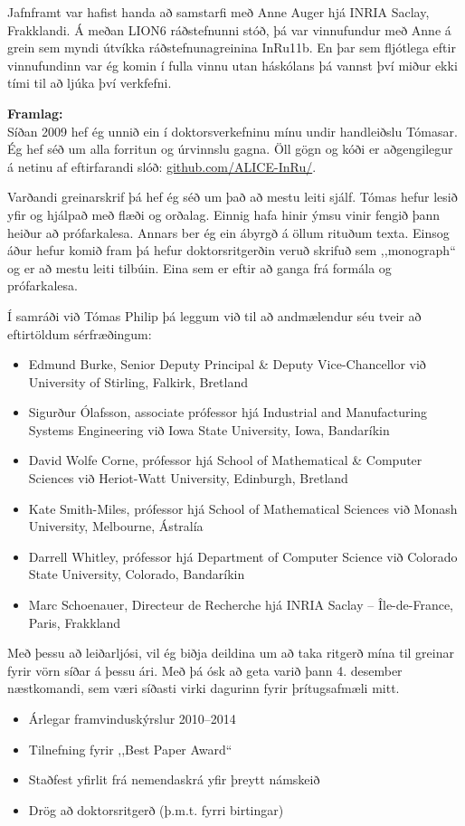 \documentclass{cover}
\newcommand{\mycaption}[1]{{\bfseries #1:}\\}
\begin{document}
{Jafnframt var hafist handa að samstarfi með Anne Auger hjá INRIA Saclay, 
Frakklandi. 
Á meðan LION6 ráðstefnunni stóð, þá var vinnufundur með Anne á grein sem myndi 
útvíkka ráðstefnunagreinina InRu11b. 
En þar sem fljótlega eftir vinnufundinn var ég komin í fulla vinnu utan 
háskólans þá vannst því miður ekki tími til að ljúka því verkfefni.

\mycaption{Framlag}
Síðan 2009 hef ég unnið ein í doktorsverkefninu mínu undir handleiðslu Tómasar. 
Ég hef séð um alla forritun og úrvinnslu gagna. Öll gögn og kóði er 
aðgengilegur á netinu af eftirfarandi slóð: \url{github.com/ALICE-InRu/}.

Varðandi greinarskrif þá hef ég séð um það að mestu leiti sjálf. Tómas hefur 
lesið yfir og hjálpað með flæði og orðalag. Einnig hafa hinir ýmsu vinir fengið 
þann heiður að prófarkalesa. Annars ber ég ein ábyrgð á öllum rituðum texta.
Einsog áður hefur komið fram þá hefur doktorsritgerðin veruð skrifuð sem 
,,monograph`` og er að mestu leiti tilbúin. Eina sem er eftir að ganga frá 
formála og prófarkalesa. 

\clearpage
Í samráði við Tómas Philip þá leggum við til að andmælendur séu tveir að 
eftirtöldum sérfræðingum:

\begin{itemize} 
    \item Edmund Burke, Senior Deputy Principal \& Deputy Vice-Chancellor við  
    University of Stirling, Falkirk, Bretland
    \item Sigurður Ólafsson, associate prófessor hjá Industrial and 
    Manufacturing Systems Engineering við Iowa State University, Iowa, 
    Bandaríkin
    \item David Wolfe Corne, prófessor hjá School of Mathematical \& Computer 
    Sciences við Heriot-Watt University, Edinburgh, Bretland
    \item Kate Smith-Miles, prófessor hjá School of Mathematical Sciences við 
    Monash University, Melbourne, Ástralía
    \item Darrell Whitley, prófessor hjá Department of Computer Science við  
    Colorado State University, Colorado, Bandaríkin
    \item Marc Schoenauer, Directeur de Recherche hjá INRIA Saclay -- 
    Île-de-France, Paris, Frakkland
\end{itemize}

Með þessu að leiðarljósi, vil ég biðja deildina um að taka ritgerð mína til 
greinar fyrir vörn síðar á þessu ári. Með þá ósk að geta varið þann 4. desember 
næstkomandi, sem væri síðasti virki dagurinn fyrir þrítugsafmæli mitt. 

}{}{
\begin{itemize}
    \item Árlegar framvinduskýrslur 2010--2014
    \item Tilnefning fyrir ,,Best Paper Award``
    \item Staðfest yfirlit frá nemendaskrá yfir þreytt námskeið 
    \item Drög að doktorsritgerð (þ.m.t. fyrri birtingar)
\end{itemize}
}
\end{document}
